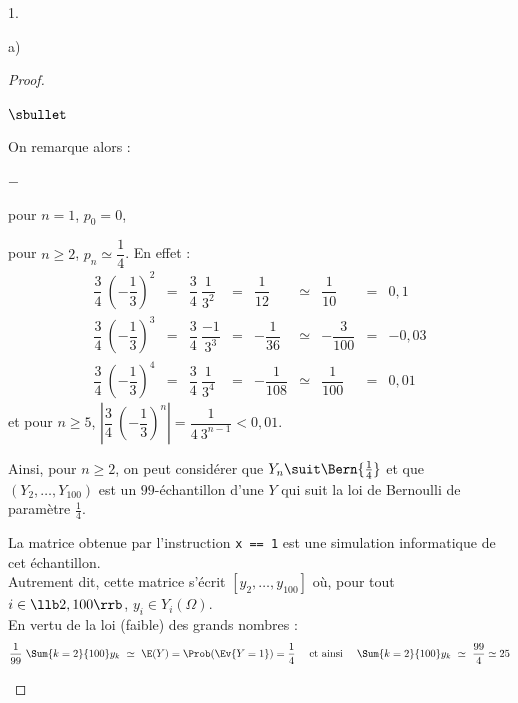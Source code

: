 \documentclass[11pt]{article}%
\begin{document}
\begin{noliste}{1.}
\begin{noliste}{a)}
\begin{proof}
\begin{noliste}{$\sbullet$}
      \item On remarque alors :
        \begin{noliste}{$-$}
        \item pour $n = 1$, $p_0 = 0$,
        \item pour $n \geq 2$, $p_n \simeq \dfrac{1}{4}$. En effet :
          \[
          \begin{array}{rcccccccr}
            \dfrac{3}{4} \ \left(-\dfrac{1}{3}\right)^2 & = &
            \dfrac{3}{4} \ \dfrac{1}{3^2} & = & \dfrac{1}{12} & \simeq &
            \dfrac{1}{10} & = & 0,1
            \\[.6cm]
            \dfrac{3}{4} \ \left(-\dfrac{1}{3}\right)^3 & = &
            \dfrac{3}{4} \ \dfrac{-1}{3^3} & = & -\dfrac{1}{36} & \simeq &
            -\dfrac{3}{100} & = & -0,03
            \\[.6cm]
            \dfrac{3}{4} \ \left(-\dfrac{1}{3}\right)^4 & = &
            \dfrac{3}{4} \ \dfrac{1}{3^4} & = & -\dfrac{1}{108} & \simeq &
            \dfrac{1}{100} & = & 0,01
          \end{array}
          \]
          et pour $n \geq 5$, $\left| \dfrac{3}{4} \
            \left(-\dfrac{1}{3}\right)^n \right| = \dfrac{1}{4 \
            3^{n-1}} < 0,01$.          
        \end{noliste}
        Ainsi, pour $n \geq 2$, on peut considérer que $Y_n \suit
        \Bern{\frac{1}{4}}$ et que $(Y_2, \ldots, Y_{100})$ est un
        $99$-échantillon d'une \var $Y$ qui suit la loi de Bernoulli
        de paramètre $\frac{1}{4}$.

      \item La matrice obtenue par l'instruction {\tt x == 1} est une
        simulation informatique de cet échantillon.\\
        Autrement dit, cette matrice s'écrit $[y_2, \ldots, y_{100}]$
        où, pour tout $i \in \llb 2, 100\rrb$, $y_i \in Y_i(\Omega)$.\\[.2cm]
        En vertu de la loi (faible) des grands nombres :
        \[
        \dfrac{1}{99} \ \Sum{k=2}{100} y_k \ \simeq \ \E(Y) =
        \Prob(\Ev{Y = 1}) = \dfrac{1}{4} \quad \text{ et ainsi } \quad
        \Sum{k=2}{100} y_k \ \simeq \ \dfrac{99}{4} \simeq 25
        \]       


\end{noliste}
\end{proof}
\end{noliste}
\end{noliste}
\end{document}
